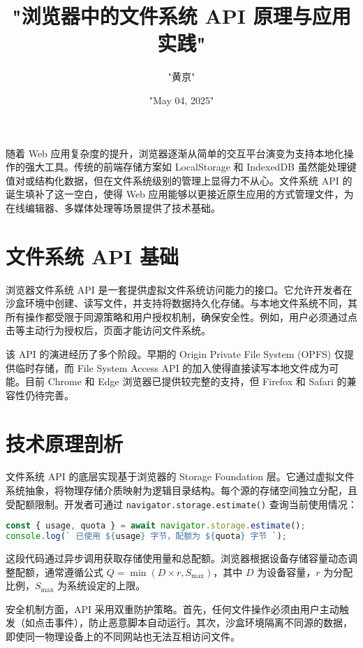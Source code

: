 \title{"浏览器中的文件系统 API 原理与应用实践"}
\author{"黄京"}
\date{"May 04, 2025"}
\maketitle
随着 Web 应用复杂度的提升，浏览器逐渐从简单的交互平台演变为支持本地化操作的强大工具。传统的前端存储方案如 LocalStorage 和 IndexedDB 虽然能处理键值对或结构化数据，但在文件系统级别的管理上显得力不从心。文件系统 API 的诞生填补了这一空白，使得 Web 应用能够以更接近原生应用的方式管理文件，为在线编辑器、多媒体处理等场景提供了技术基础。\par
\chapter{文件系统 API 基础}
浏览器文件系统 API 是一套提供虚拟文件系统访问能力的接口。它允许开发者在沙盒环境中创建、读写文件，并支持将数据持久化存储。与本地文件系统不同，其所有操作都受限于同源策略和用户授权机制，确保安全性。例如，用户必须通过点击等主动行为授权后，页面才能访问文件系统。\par
该 API 的演进经历了多个阶段。早期的 Origin Private File System (OPFS) 仅提供临时存储，而 File System Access API 的加入使得直接读写本地文件成为可能。目前 Chrome 和 Edge 浏览器已提供较完整的支持，但 Firefox 和 Safari 的兼容性仍待完善。\par
\chapter{技术原理剖析}
文件系统 API 的底层实现基于浏览器的 Storage Foundation 层。它通过虚拟文件系统抽象，将物理存储介质映射为逻辑目录结构。每个源的存储空间独立分配，且受配额限制。开发者可通过 \verb!navigator.storage.estimate()! 查询当前使用情况：\par
\begin{lstlisting}[language=javascript]
const { usage, quota } = await navigator.storage.estimate();
console.log(` 已使用 ${usage} 字节，配额为 ${quota} 字节 `);
\end{lstlisting}
这段代码通过异步调用获取存储使用量和总配额。浏览器根据设备存储容量动态调整配额，通常遵循公式 $Q = \min(D \times r, S_{\max})$，其中 $D$ 为设备容量，$r$ 为分配比例，$S_{\max}$ 为系统设定的上限。\par
安全机制方面，API 采用双重防护策略。首先，任何文件操作必须由用户主动触发（如点击事件），防止恶意脚本自动运行。其次，沙盒环境隔离不同源的数据，即使同一物理设备上的不同网站也无法互相访问文件。\par
